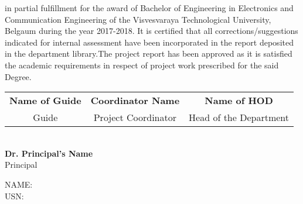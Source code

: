 \documentclass[11pt,a4paper]{article}
\begin{document}
in partial fulfillment for the award of Bachelor of Engineering in Electronics and Communication Engineering of the Visvesvaraya Technological University, Belgaum during the year 2017-2018. It is certified that all corrections/suggestions indicated for internal assessment have been incorporated in the report deposited in the department library.The project report has been approved as it is satisfied the academic requirements in respect of project work prescribed for the said Degree.\\
\vspace{0.01in}
\begin{center}
\begin{tabular}{c c c}
\textbf{Name of Guide} & \hspace{2cm} \textbf{Coordinator Name} & \hspace{1.5cm} \textbf{Name of HOD}\\
Guide & \hspace{2cm} Project Coordinator  & \hspace{1.5cm} Head of the Department\\
\end{tabular}\\
\vspace{0.5in}
\textbf{Dr. Principal's Name}\\Principal
\end{center}
NAME:\\

\vspace{1cm}
USN:\hspace{1cm} \begin{tabular}{|ll|ll|ll|ll|ll|ll|ll|ll|ll|ll|ll|ll|ll|ll|ll|ll|ll|ll|ll|ll|} \hline
& & & & & & & & & & & & & & & & & & &\\
\hline

\end{tabular}
\end{document}
